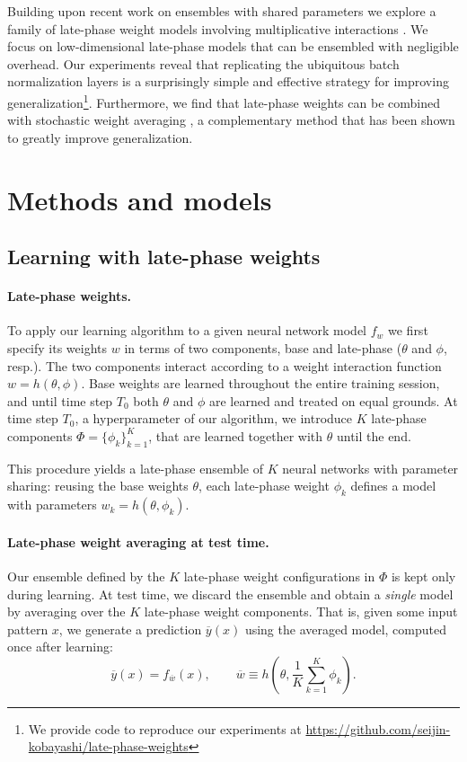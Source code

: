 \documentclass{article} \usepackage{iclr2021_conference,times}
\begin{document}
Building upon recent work on ensembles with shared parameters \citep{wen_batchensemble_2020} we explore a family of late-phase weight models involving multiplicative interactions \citep{jayakumar_multiplicative_2020}. We focus on low-dimensional late-phase models that can be ensembled with negligible overhead. Our experiments reveal that replicating the ubiquitous batch normalization layers \citep{ioffe_batch_2015} is a surprisingly simple and effective strategy for improving generalization\footnote{We provide code to reproduce our experiments at \url{https://github.com/seijin-kobayashi/late-phase-weights}}. Furthermore, we find that late-phase weights can be combined with stochastic weight averaging \citep[][]{izmailov_averaging_2018}, a complementary method that has been shown to greatly improve generalization.

\section{Methods and models}

\subsection{Learning with late-phase weights}
\paragraph{Late-phase weights.} To apply our learning algorithm to a given neural network model $f_w$ we first specify its weights $w$ in terms of two components, base and late-phase ($\theta$ and $\phi$, resp.). The two components interact according to a weight interaction function $w = h(\theta, \phi)$. Base weights are learned throughout the entire training session, and until time step $T_0$ both $\theta$ and $\phi$ are learned and treated on equal grounds. At time step $T_0$, a hyperparameter of our algorithm, we introduce $K$ late-phase components $\Phi=\{\phi_k\}_{k=1}^{K}$, that are learned together with $\theta$ until the end.

This procedure yields a late-phase ensemble of $K$ neural networks with parameter sharing: reusing the base weights $\theta$, each late-phase weight $\phi_k$ defines a model with parameters $w_k = h(\theta, \phi_k)$.

\paragraph{Late-phase weight averaging at test time.} Our ensemble defined by the $K$ late-phase weight configurations in $\Phi$ is kept only during learning. At test time, we discard the ensemble and obtain a \emph{single} model by averaging over the $K$ late-phase weight components. That is, given some input pattern $x$, we generate a prediction $\overline{y}(x)$ using the averaged model, computed once after learning:
\begin{equation}
\label{eq:test-time-averaging}
  \overline{y}(x) = f_{\overline{w}}(x), \qquad \overline{w} \equiv h\left(\theta, \frac{1}{K} \sum_{k=1}^K \phi_k\right).
\end{equation}
\end{document}

